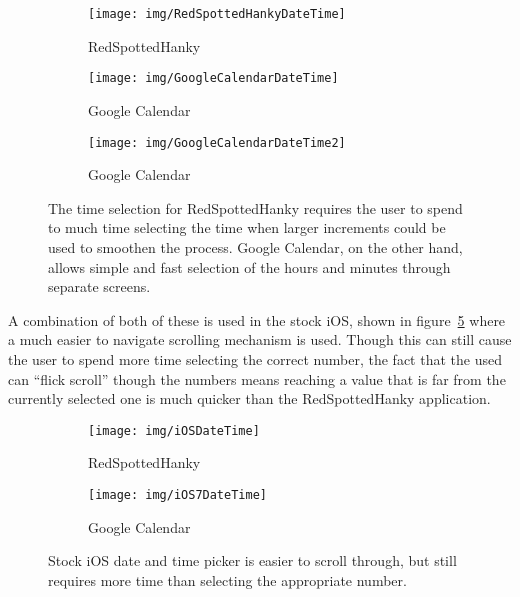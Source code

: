 \begin{figure}[ht]
    \centering
    \begin{subfigure}[b]{0.25\textwidth}
        \texttt{[image: img/RedSpottedHankyDateTime]}
        \caption{RedSpottedHanky}\label{fig:RedSpottedHankyDateTime}
    \end{subfigure}%
    \qquad
    \begin{subfigure}[b]{0.25\textwidth}
        \texttt{[image: img/GoogleCalendarDateTime]}
        \caption{Google Calendar}\label{fig:GoogleCalendarDateTime}
    \end{subfigure}
    \qquad
    \begin{subfigure}[b]{0.25\textwidth}
        \texttt{[image: img/GoogleCalendarDateTime2]}
        \caption{Google Calendar}\label{fig:GoogleCalendarDateTime2}
    \end{subfigure}
    \caption{The time selection for RedSpottedHanky requires the user to
    spend to much time selecting the time when larger increments could be
    used to smoothen the process. Google Calendar, on the other hand,
    allows simple and fast selection of the hours and minutes through
    separate screens.}\label{fig:date_time_selection}
\end{figure}

A combination of both of these is used in the stock iOS, shown in
figure~\ref{fig:iOSDateTime}\cite{iOSDateTime} where a much easier to navigate
scrolling mechanism is used. Though this can still cause the user to spend more
time selecting the correct number, the fact that the used can ``flick scroll''
though the numbers means reaching a value that is far from the currently
selected one is much quicker than the RedSpottedHanky application.

\begin{figure}[ht]
    \centering
    \begin{subfigure}[b]{0.25\textwidth}
        \texttt{[image: img/iOSDateTime]}
        \caption{RedSpottedHanky}
    \end{subfigure}%
    \qquad
    \begin{subfigure}[b]{0.35\textwidth}
        \texttt{[image: img/iOS7DateTime]}
        \caption{Google Calendar}
    \end{subfigure}
    \caption{Stock iOS date and time picker is easier to scroll through,
    but still requires more time than selecting the appropriate
    number.}\label{fig:iOSDateTime}
\end{figure}

